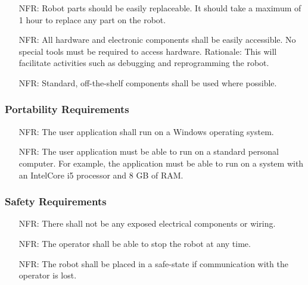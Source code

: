 \documentclass[12pt]{article}
\newcounter{nfrnum} %
\begin{document}
\noindent \begin{itemize}
\item[NFR\refstepcounter{nfrnum}\thenfrnum \label{NFR_Maintainability1}:] Robot parts should be easily replaceable. It should take a maximum of 1 hour to replace any part on the robot.
\item[NFR\refstepcounter{nfrnum}\thenfrnum \label{NFR_Maintainability2}:] All hardware and electronic components shall be easily accessible. No special tools must be required to access hardware. 
\newline Rationale: This will facilitate activities such as debugging and reprogramming the robot. 
\item[NFR\refstepcounter{nfrnum}\thenfrnum \label{NFR_Maintainability2}:] Standard, off-the-shelf components shall be used where possible. 
\end{itemize}

\subsubsection{Portability Requirements}

\noindent \begin{itemize}
\item[NFR\refstepcounter{nfrnum}\thenfrnum \label{NFR_Portability1}:] The user application shall run on a Windows operating system.
\item[NFR\refstepcounter{nfrnum}\thenfrnum \label{NFR_Portability2}:] The user application must be able to run on a standard personal computer. For example, the application must be able to run on a system with an IntelCore i5 processor and 8 GB of RAM.
\end{itemize}

\subsubsection{Safety Requirements}
\noindent \begin{itemize}
\item[NFR\refstepcounter{nfrnum}\thenfrnum \label{NFR_Safety1}:] There shall not be any exposed electrical components or wiring.
\item[NFR\refstepcounter{nfrnum}\thenfrnum \label{NFR_Safety1}:] The operator shall be able to stop the robot at any time.
\item[NFR\refstepcounter{nfrnum}\thenfrnum \label{NFR_Safety2}:] The robot shall be placed in a safe-state if communication with the operator is lost.
\end{itemize}
\end{document}
